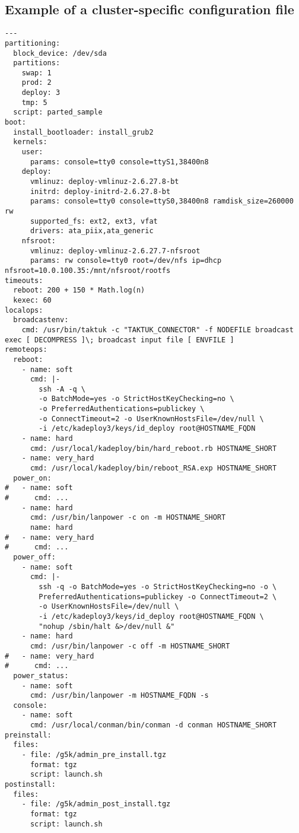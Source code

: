 \documentclass[a4wide,10pt,oneside]{book}
\begin{document}
\subsection{Example of a cluster-specific configuration file}
\begin{small}
\begin{verbatim}
---
partitioning:
  block_device: /dev/sda
  partitions:
    swap: 1
    prod: 2
    deploy: 3
    tmp: 5
  script: parted_sample
boot:
  install_bootloader: install_grub2
  kernels:
    user:
      params: console=tty0 console=ttyS1,38400n8
    deploy:
      vmlinuz: deploy-vmlinuz-2.6.27.8-bt
      initrd: deploy-initrd-2.6.27.8-bt
      params: console=tty0 console=ttyS0,38400n8 ramdisk_size=260000 rw
      supported_fs: ext2, ext3, vfat
      drivers: ata_piix,ata_generic
    nfsroot:
      vmlinuz: deploy-vmlinuz-2.6.27.7-nfsroot
      params: rw console=tty0 root=/dev/nfs ip=dhcp nfsroot=10.0.100.35:/mnt/nfsroot/rootfs
timeouts:
  reboot: 200 + 150 * Math.log(n)
  kexec: 60
localops:
  broadcastenv:
    cmd: /usr/bin/taktuk -c "TAKTUK_CONNECTOR" -f NODEFILE broadcast exec [ DECOMPRESS ]\; broadcast input file [ ENVFILE ]
remoteops:
  reboot:
    - name: soft
      cmd: |-
        ssh -A -q \
        -o BatchMode=yes -o StrictHostKeyChecking=no \
        -o PreferredAuthentications=publickey \
        -o ConnectTimeout=2 -o UserKnownHostsFile=/dev/null \
        -i /etc/kadeploy3/keys/id_deploy root@HOSTNAME_FQDN
    - name: hard
      cmd: /usr/local/kadeploy/bin/hard_reboot.rb HOSTNAME_SHORT
    - name: very_hard
      cmd: /usr/local/kadeploy/bin/reboot_RSA.exp HOSTNAME_SHORT
  power_on:
#   - name: soft
#      cmd: ...
    - name: hard
      cmd: /usr/bin/lanpower -c on -m HOSTNAME_SHORT
      name: hard
#   - name: very_hard
#      cmd: ...
  power_off:
    - name: soft
      cmd: |-
        ssh -q -o BatchMode=yes -o StrictHostKeyChecking=no -o \
        PreferredAuthentications=publickey -o ConnectTimeout=2 \
        -o UserKnownHostsFile=/dev/null \
        -i /etc/kadeploy3/keys/id_deploy root@HOSTNAME_FQDN \
        "nohup /sbin/halt &>/dev/null &"
    - name: hard
      cmd: /usr/bin/lanpower -c off -m HOSTNAME_SHORT
#   - name: very_hard
#      cmd: ...
  power_status:
    - name: soft
      cmd: /usr/bin/lanpower -m HOSTNAME_FQDN -s
  console:
    - name: soft
      cmd: /usr/local/conman/bin/conman -d conman HOSTNAME_SHORT
preinstall:
  files:
    - file: /g5k/admin_pre_install.tgz
      format: tgz
      script: launch.sh
postinstall:
  files:
    - file: /g5k/admin_post_install.tgz
      format: tgz
      script: launch.sh

\end{verbatim}
\end{small}
\end{document}
